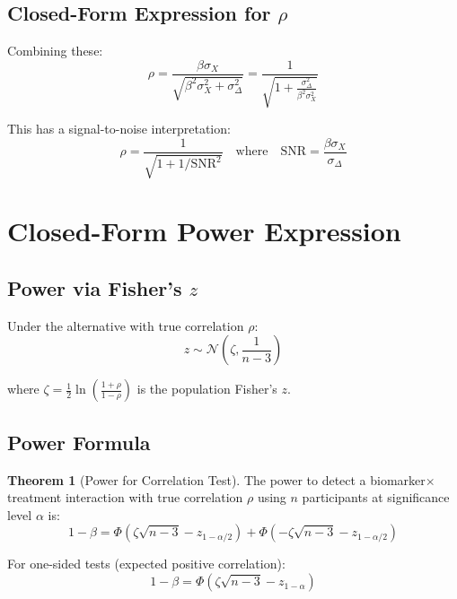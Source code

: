 \documentclass[11pt]{article}
\theoremstyle{definition}
\newtheorem{theorem}{Theorem}
\begin{document}
\subsection{Closed-Form Expression for $\rho$}

Combining these:
\begin{equation}
\boxed{\rho = \frac{\beta \sigma_X}{\sqrt{\beta^2 \sigma_X^2 + \sigma_{\Delta}^2}}
= \frac{1}{\sqrt{1 + \frac{\sigma_{\Delta}^2}{\beta^2 \sigma_X^2}}}}
\end{equation}

This has a signal-to-noise interpretation:
\begin{equation}
\rho = \frac{1}{\sqrt{1 + 1/\text{SNR}^2}} \quad \text{where} \quad
\text{SNR} = \frac{\beta \sigma_X}{\sigma_{\Delta}}
\end{equation}

\section{Closed-Form Power Expression}

\subsection{Power via Fisher's $z$}

Under the alternative with true correlation $\rho$:
\begin{equation}
z \sim \mathcal{N}\left(\zeta, \frac{1}{n-3}\right)
\end{equation}

where $\zeta = \frac{1}{2}\ln\left(\frac{1+\rho}{1-\rho}\right)$ is the
population Fisher's $z$.

\subsection{Power Formula}

\begin{theorem}[Power for Correlation Test]
The power to detect a biomarker$\times$treatment interaction with true
correlation $\rho$ using $n$ participants at significance level $\alpha$ is:
\begin{equation}
\boxed{1 - \beta = \Phi\left(\zeta\sqrt{n-3} - z_{1-\alpha/2}\right)
+ \Phi\left(-\zeta\sqrt{n-3} - z_{1-\alpha/2}\right)}
\end{equation}

For one-sided tests (expected positive correlation):
\begin{equation}
1 - \beta = \Phi\left(\zeta\sqrt{n-3} - z_{1-\alpha}\right)
\end{equation}
\end{theorem}
\end{document}
